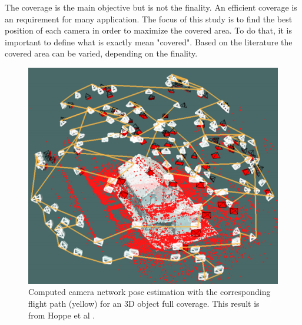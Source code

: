 The coverage is the main objective but is not the finality. An efficient coverage is an requirement for many application.
The focus of this study is to find the best position of each camera in order to maximize the covered area. To do that, it is important to define what is exactly mean "covered". Based on the literature the covered area can be varied, depending on the finality. 
\begin{figure}[t!]
\center
{}
   \includegraphics[width=\linewidth]{img/objectCoverFrom142.png}
  \caption{ Computed camera network pose estimation with the corresponding flight path (yellow) for an 3D object full coverage. This result is from Hoppe et al \cite{142*hoppe2012}.}\label{fig:ObjectCover142}
  \endminipage\hfill
\end{figure}

